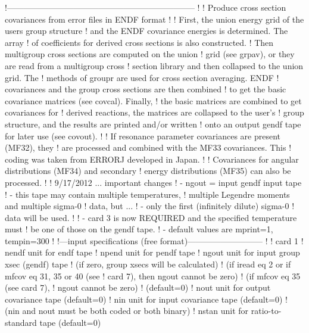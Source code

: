 \newpage
\small
\begin{ccode}

   !--------------------------------------------------------------------
   !
   ! Produce cross section covariances from error files in ENDF format
   !
   ! First, the union energy grid of the users group structure
   ! and the ENDF covariance energies is determined.  The array
   ! of coefficients for derived cross sections is also constructed.
   ! Then multigroup cross sections are computed on the union
   ! grid (see grpav), or they are read from a multigroup cross
   ! section library and then collapsed to the union grid.  The
   ! methods of groupr are used for cross section averaging.  ENDF
   ! covariances and the group cross sections are then combined
   ! to get the basic covariance matrices (see covcal).  Finally,
   ! the basic matrices are combined to get covariances for
   ! derived reactions, the matrices are collapsed to the user's
   ! group structure, and the results are printed and/or written
   ! onto an output gendf tape for later use (see covout).
   !
   ! If resonance parameter covariances are present (MF32), they
   ! are processed and combined with the MF33 covariances.  This
   ! coding was taken from ERRORJ developed in Japan.
   !
   ! Covariances for angular distributions (MF34) and secondary
   ! energy distributions (MF35) can also be processed.
   !
   ! 9/17/2012 ... important changes
   ! - ngout = input gendf input tape
   !           - this tape may contain multiple temperatures,
   !             multiple Legendre moments and multiple sigma-0
   !             data, but ...
   !           - only the first (infinitely dilute) sigma-0
   !             data will be used.
   !
   ! - card 3 is now REQUIRED and the specified temperature must
   !   be one of those on the gendf tape.
   !   - default values are mprint=1, tempin=300
   !
   !---input specifications (free format)---------------------------
   !
   !  card 1
   !    nendf   unit for endf tape
   !    npend   unit for pendf tape
   !    ngout   unit for input group xsec (gendf) tape
   !            (if zero, group xsecs will be calculated)
   !            (if iread eq 2 or if mfcov eq 31, 35 or 40 (see
   !             card 7), then ngout cannot be zero)
   !            (if mfcov eq 35 (see card 7),
   !              ngout cannot be zero)
   !            (default=0)
   !    nout    unit for output covariance tape (default=0)
   !    nin     unit for input covariance tape (default=0)
   !            (nin and nout must be both coded or both binary)
   !    nstan   unit for ratio-to-standard tape (default=0)

\end{ccode}
